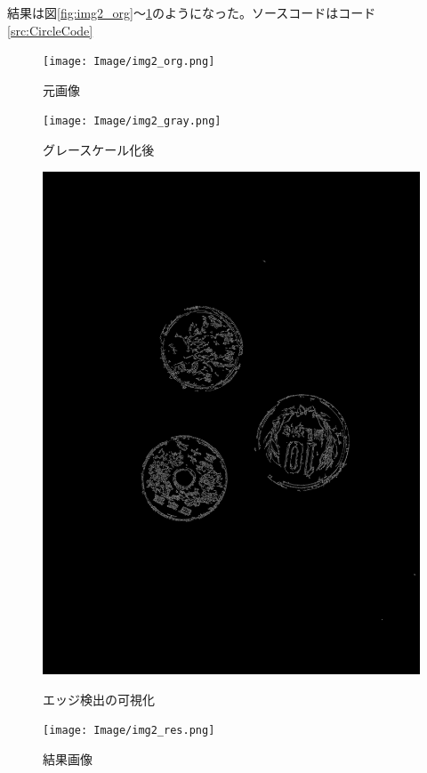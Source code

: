 \documentclass{jlreq}
\begin{document}
結果は図\ref{fig:img2_org}～\ref{fig:img2_res}のようになった。ソースコードはコード\ref{src:CircleCode}

\begin{figure}
	\begin{minipage}{0.24\linewidth}
		\centering
		\texttt{[image: Image/img2\_org.png]}
		\caption{元画像} \label{fig:img2_org}
	\end{minipage}
	\hfill
	\begin{minipage}{0.24\linewidth}
		\centering
		\texttt{[image: Image/img2\_gray.png]}
		\caption{グレースケール化後} \label{fig:img2_gray}
	\end{minipage}
	\hfill
	\begin{minipage}{0.24\linewidth}
		\centering
		\includegraphics[width=\linewidth]{Image/img2_edge.png}
		\caption{エッジ検出の可視化} \label{fig:img2_edge}
	\end{minipage}
	\hfill
	\begin{minipage}{0.24\linewidth}
		\centering
		\texttt{[image: Image/img2\_res.png]}
		\caption{結果画像} \label{fig:img2_res}
	\end{minipage}
\end{figure}
\end{document}
